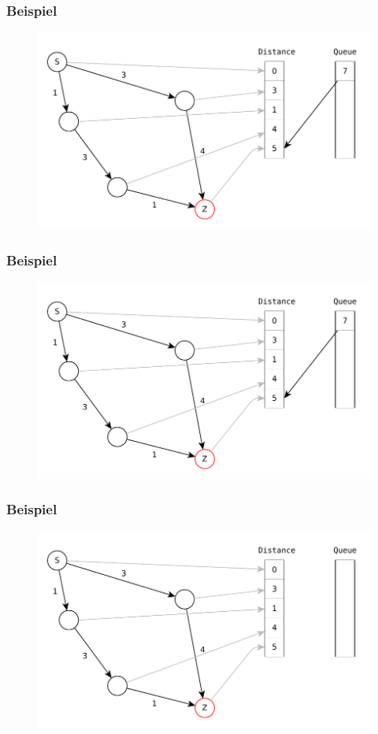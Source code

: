 \begin{frame}
\frametitle{Beispiel}
\begin{figure}
\includegraphics[scale=.8]{dijkstra_graphs/dijkstra_9.pdf}
\end{figure}
\end{frame}

\begin{frame}
\frametitle{Beispiel}
\begin{figure}
\includegraphics[scale=.8]{dijkstra_graphs/dijkstra_A.pdf}
\end{figure}
\end{frame}

\begin{frame}
\frametitle{Beispiel}
\begin{figure}
\includegraphics[scale=.8]{dijkstra_graphs/dijkstra_B.pdf}
\end{figure}
\end{frame}
